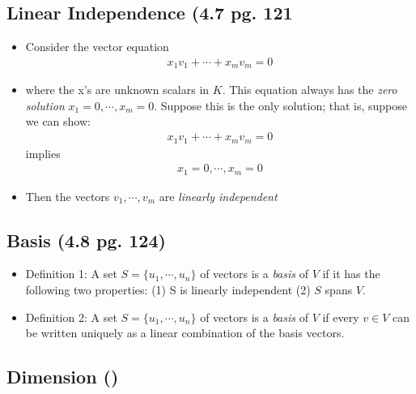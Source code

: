 \documentclass[hidelinks, 11pt, openleft]{scrartcl}
\begin{document}
    \subsection*{Linear Independence (4.7 pg. 121}
        \begin{itemize}
            \item Consider the vector equation
            \begin{align*}
                x_1v_1 + \cdots + x_mv_m = 0
            \end{align*}
            \item where the x's are unknown scalars in $K$. This equation always has the \textit{zero solution} $x_1=0, \cdots,x_m=0$. Suppose this is the only solution; that is, suppose we can show:
            \begin{align*}
                x_1v_1 + \cdots + x_mv_m = 0
            \end{align*}
            implies
            \begin{align*}
                x_1=0, \cdots ,x_m=0
            \end{align*}
            \item Then the vectors $v_1, \cdots ,v_m$ are \textit{linearly independent}
        \end{itemize}
    
    \subsection*{Basis (4.8 pg. 124)}
        \begin{itemize}
            \item Definition 1: A set $S = \{u_1, \cdots, u_n\}$ of vectors is a \textit{basis} of $V$ if it has the following two properties: (1) S is linearly independent (2) $S$ spans $V$.
            \item Definition 2: A set $S = \{u_1, \cdots, u_n\}$ of vectors is a \textit{basis} of $V$ if every $v \in V$ can be written uniquely as a linear combination of the basis vectors. 
        \end{itemize}
        
    \subsection*{Dimension ()}
    \vspace{10 cm}
    
\end{document}
